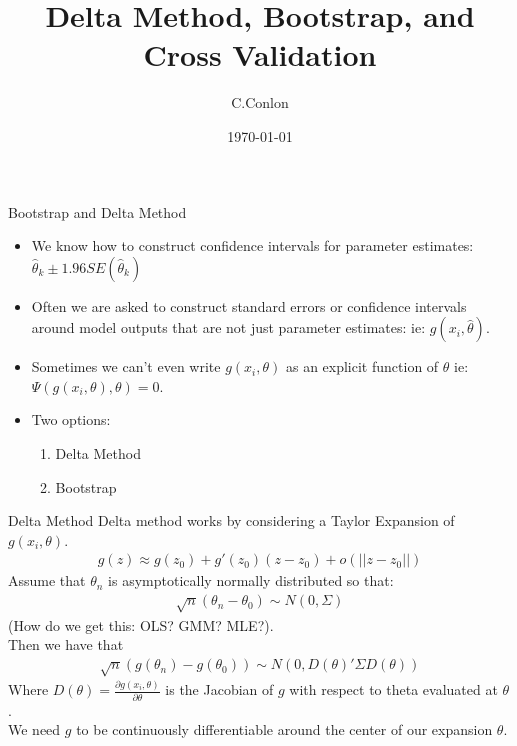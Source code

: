 \documentclass[aspectratio=169]{beamer}
\title [Bootstrap]{Delta Method, Bootstrap, and Cross Validation}
\author{C.Conlon}
\institute{Applied Econometrics II}
\date{\today}
\begin{document}
\begin{frame}
\titlepage
\end{frame}


\begin{frame}{Bootstrap and Delta Method}
\begin{itemize}
\item We know how to construct confidence intervals for parameter estimates:  $\hat{\theta}_k \pm 1.96 SE(\hat{\theta}_k)$
\item Often we are asked to construct standard errors or confidence intervals around model outputs that are not just parameter estimates: ie:  $g(x_i,\hat{\theta})$.
\item Sometimes we can't even write $g(x_i,\theta)$ as an explicit function of $\theta$ ie: $\Psi(g(x_i,\theta),\theta) = 0$.
\item Two options:
\begin{enumerate}
\item Delta Method
\item Bootstrap
\end{enumerate}
\end{itemize}
\end{frame}

\begin{frame}{Delta Method}
Delta method works by considering a \alert{Taylor Expansion} of $g(x_i,\theta)$.
\begin{eqnarray*}
g(z) \approx g(z_0) + g'(z_0)(z-z_0) + o(||z-z_0||)
\end{eqnarray*}
Assume that $\theta_n$ is asymptotically normally distributed so that:
\begin{eqnarray*}
\sqrt{n} (\theta_n - \theta_0) \sim N(0,\Sigma)
\end{eqnarray*}
(How do we get this: OLS? GMM? MLE?).\\

Then we have that 
\begin{eqnarray*}
\sqrt{n} (g(\theta_n) - g(\theta_0)) \sim N(0,D(\theta)' \Sigma  D(\theta))
\end{eqnarray*}
Where $D(\theta) = \frac{\partial g(x_i, \theta)}{\partial \theta}$ is the Jacobian of $g$ with respect to theta evaluated at $\theta$.\\
We need $g$ to be continuously differentiable around the center of our expansion $\theta$.
\end{frame}
\end{document}
